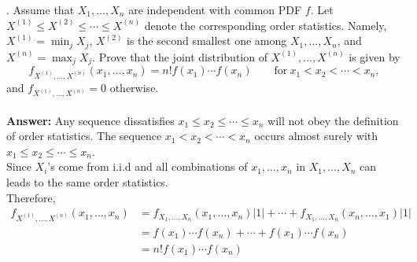 \documentclass[onecolumn, 12pt]{IEEEtran}
\begin{document}
. Assume that $X_1, \dots, X_n$ are independent with common PDF $f$. Let $X^{(1)}\le X^{(2)}\le \cdots \le X^{(n)}$ denote the corresponding order statistics. Namely, $X^{(1)} = \min_j X_j$, $X^{(2)}$ is the second smallest one among
$X_1, \dots, X_n$, and $X^{(n)} = \max_j X_j$.
Prove that the joint distribution of $X^{(1)},
\dots, X^{(n)}$ is given by
\begin{equation*}
f_{X^{(1)}, \dots, X^{(n)}}(x_1, \dots, x_n) = n!f(x_1)\cdots f(x_n) \qquad\mathrm{for}\  x_1 < x_2 < \cdots < x_n,
\end{equation*}
and $f_{X^{(1)}, \dots, X^{(n)}}= 0$ otherwise.\\
\noindent 
\vspace*{0.1in}\\
\noindent 
{\bf Answer:}
\noindent Any sequence dissatisfies $x_1 \le x_2 \le \cdots \le x_n$ will not obey the definition of order statistics. The sequence $x_1 < x_2 < \cdots < x_n$ occurs almost surely with $x_1 \le x_2 \le \cdots \le x_n$.\\
Since $X_i$'s come from i.i.d and all combinations of $x_1, \dots, x_n$ in $X_1, \dots, X_n$ can leads to the same order statistics.\\
Therefore,
\begin{equation*}
\begin{aligned}
f_{X^{(1)}, \dots, X^{(n)}}(x_1, \dots, x_n) &=f_{X_1, \dots, X_n}(x_1, \dots, x_n)|1|+\cdots+f_{X_1, \dots, X_n}(x_n, \dots, x_1)|1|\\
&=f(x_1)\cdots f(x_n)+\cdots+f(x_1)\cdots f(x_n)\\
& = n!f(x_1)\cdots f(x_n)
\end{aligned}
\end{equation*} 

\vspace*{0.3in}
\end{document}
